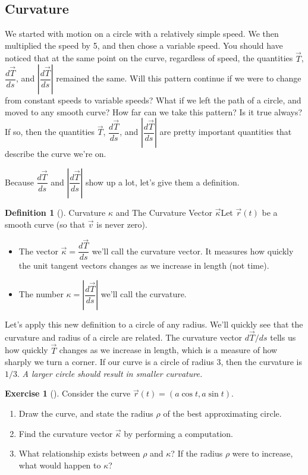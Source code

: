 \documentclass[10pt,]{book}
\theoremstyle{plain}
\theoremstyle{definition}
\newtheorem{definition}[theorem]{Definition}
\theoremstyle{definition}
\theoremstyle{definition}
\theoremstyle{definition}
\newtheorem{exploration}[project]{Exercise}
\theoremstyle{definition}
\numberwithin{equation}{section}
\begin{document}
\subsection[{Curvature}]{Curvature}\label{subsection-43}
We started with motion on a circle with a relatively simple speed. We then multiplied the speed by 5, and then chose a variable speed. You should have noticed that at the same point on the curve, regardless of speed, the quantities \(\vec T\), \(\dfrac{d\vec T}{ds}\), and \(\left|\dfrac{d\vec T}{ds}\right|\) remained the same. Will this pattern continue if we were to change from constant speeds to variable speeds? What if we left the path of a circle, and moved to any smooth curve? How far can we take this pattern? Is it true always? If so, then the quantities \(\vec T\), \(\dfrac{d\vec T}{ds}\), and \(\left|\dfrac{d\vec T}{ds}\right|\) are pretty important quantities that describe the curve we're on.%
\par
Because \(\dfrac{d\vec T}{ds}\) and \(\left|\dfrac{d\vec T}{ds}\right|\) show up a lot, let's give them a definition.%
\begin{definition}[{}]\label{def_curvature}
Curvature \(\kappa\) and The Curvature Vector \(\vec \kappa\)Let \(\vec r(t)\) be a smooth curve (so that \(\vec v\) is never zero). \leavevmode%
\begin{itemize}[label=\textbullet]
\item{}The vector \(\vec \kappa = \dfrac{d\vec T}{ds}\) we'll call the curvature vector. It measures how quickly the unit tangent vectors changes as we increase in length (not time).%
\item{}The number \(\kappa = \left|\dfrac{d\vec T}{ds}\right|\) we'll call the curvature.%
\end{itemize}
%
\end{definition}
Let's apply this new definition to a circle of any radius. We'll quickly see that the curvature and radius of a circle are related. The curvature vector \(d\vec T/ds\) tells us how quickly \(\vec T\) changes as we increase in length, which is a measure of how sharply we turn a corner. If our curve is a circle of radius \(3\), then the curvature is \(1/3\). \emph{A larger circle should result in smaller curvature.}%
\begin{exploration}[]\label{exploration-170}
Consider the curve \(\vec r(t)=(a\cos t, a\sin t)\).%
\begin{enumerate}[font=\bfseries,label=(\alph*),ref=\alph*]
\item\label{task-414} Draw the curve, and state the radius \(\rho\) of the best approximating circle.%
\item\label{task-415} Find the curvature vector \(\vec \kappa\) by performing a computation.%
\item\label{task-416} What relationship exists between \(\rho\) and \(\kappa\)?  If the radius \(\rho\) were to increase, what would happen to \(\kappa\)?%
\end{enumerate}
\end{exploration}
\end{document}
